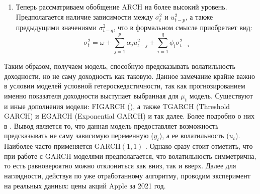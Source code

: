 \begin{enumerate}
	\item Теперь рассматриваем обобщение ARCH на более высокий уровень. Предполагается наличие зависимости между $\sigma^2_t$ и $u^2_{t - p}$, а также предыдущими значениями $\sigma^2_{t - q}$, что в формальном смысле приобретает вид:
	\begin{equation} \label{link::garch}
		\sigma^2_t = \omega + \sum_{j = 1}^p \alpha_j u_{t - j}^2 + \sum_{i = 1}^q \phi_i \sigma^2_{t - i}
	\end{equation}
\end{enumerate}
Таким образом, получаем модель, способную предсказывать волатильность доходности, но не саму доходность как таковую. Данное замечание крайне важно в условии моделей условной гетероскедастичности, так как прогнозированием именно показателя доходности выступает выбранная для $\mu_t$ модель. Существуют и иные дополнения модели: FIGARCH (), а также TGARCH (Threshold GARCH) и EGARCH (Exponential GARCH) и так далее. Более подробно о них в \cite{verbik_econometrics_garchs}. Вывод является то, что данная модель предоставляет возможность предсказывать не саму зависимую переменную ($y_t$), а ее волатильность ($u_t$). Наиболее часто применяется GARCH$(1, 1)$ \cite{hansen2005forecast}. Однако сразу стоит отметить, что при работе с GARCH моделями предполагается, что волатильность симметрична, то есть равновероятно можно отклониться как вниз, так и вверх. Далее для наглядности, действуя по уже отработанному алгоритму, проводим эксперимент на реальных данных: цены акций Apple за 2021 год.\\

